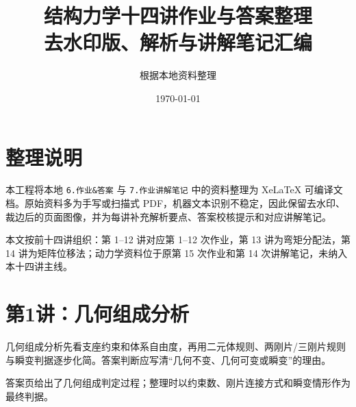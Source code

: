 \documentclass[UTF8,12pt,a4paper,openany]{ctexbook}
\title{结构力学十四讲作业与答案整理\\\large 去水印版、解析与讲解笔记汇编}
\author{根据本地资料整理}
\date{\today}
\begin{document}
\maketitle
\frontmatter
\chapter*{整理说明}
本工程将本地 \texttt{6.作业\&答案} 与 \texttt{7.作业讲解笔记} 中的资料整理为 XeLaTeX 可编译文档。原始资料多为手写或扫描式 PDF，机器文本识别不稳定，因此保留去水印、裁边后的页面图像，并为每讲补充解析要点、答案校核提示和对应讲解笔记。
\par 本文按前十四讲组织：第 1--12 讲对应第 1--12 次作业，第 13 讲为弯矩分配法，第 14 讲为矩阵位移法；动力学资料位于原第 15 次作业和第 14 次讲解笔记，未纳入本十四讲主线。
\tableofcontents
\mainmatter
\chapter{第1讲：几何组成分析}
\begin{tcolorbox}[title=解析要点]
几何组成分析先看支座约束和体系自由度，再用二元体规则、两刚片/三刚片规则与瞬变判据逐步化简。答案判断应写清“几何不变、几何可变或瞬变”的理由。
\end{tcolorbox}
\begin{tcolorbox}[title=答案与校核]
答案页给出了几何组成判定过程；整理时以约束数、刚片连接方式和瞬变情形作为最终判据。
\end{tcolorbox}
\end{document}
